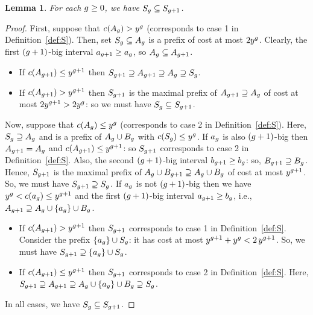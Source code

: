 \documentclass[11pt]{article}
\newcommand{\base}{y}
\newtheorem{lem}[thm]{Lemma}
\theoremstyle{remark}
\theoremstyle{plain}
\theoremstyle{remark}
\begin{document}
\begin{lem}\label{lem:smqi-nested}
    For each $g\ge 0$, we have $S_g \subseteq S_{g+1}$. 
\end{lem}
\begin{proof}  First, suppose that $c(A_g)> y^g$ (corresponds to case 1 in Definition~\ref{def:S}). Then, set $S_g\subseteq A_g$ is a prefix of cost at most $2\base^\i$.      
   Clearly, the first $(g+1)$-big interval $a_{g+1}\ge a_g$, so $A_g\subseteq A_{g+1}$.  
   \begin{itemize}
    \item  
   If $c(A_{\i+1})\le \base^{\i+1}$ then $S_{g+1}\supseteq A_{g+1}\supseteq A_g \supseteq S_g$. 
   \item If $c(A_{\i+1})>\base^{\i+1}$ then $S_{g+1}$ is the maximal prefix of $A_{g+1}\supseteq A_g$ of cost at most $2\base^{\i+1}> 2\base^\i$: so  we must have $S_g\subseteq S_{g+1}$.
   \end{itemize}


    Now, suppose that $c(A_g)\le y^g$ (corresponds to case 2 in  Definition~\ref{def:S}). Here, $S_g\supseteq A_g$ and is a prefix of $A_g\cup B_g$ with $c(\t_\i)\le \base^\i$. 
    If $a_g$ is also $(g+1)$-big then $A_{g+1}=A_g$ and $c(A_{g+1})\le y^{g+1}$: so $S_{g+1}$ corresponds to case 2 in  Definition~\ref{def:S}. Also, the second $(g+1)$-big interval $b_{g+1}\ge b_g$: so, $B_{g+1}\supseteq B_g$. Hence,  $S_{g+1}$ is the maximal prefix of $A_g\cup B_{g+1}\supseteq A_g\cup B_g$ of cost at most $y^{g+1}$. So, we must have $S_{g+1}\supseteq S_g$.  
 If $a_g$ is not $(g+1)$-big then we have $\base^\i < c(a_\i)\le \base^{\i+1}$ and the first $(g+1)$-big interval  $a_{g+1}\ge b_g$, i.e., $A_{g+1}\supseteq  A_g\cup \{a_g\} \cup B_g  $. 
    \begin{itemize}
    \item  
If $c(A_{\i+1})>\base^{\i+1}$ then $S_{g+1}$ corresponds to case 1 in    Definition~\ref{def:S}.   Consider the prefix $\{a_g\}\cup S_g$: it has cost at most $\base^{\i+1} + \base^\i< 2\, \base^{\i+1}$. So, we must have $S_{g+1}\supseteq \{a_g\}\cup S_g$.

\item If $c(A_{\i+1})\le \base^{\i+1}$ then $S_{g+1}$ corresponds to case 2 in    Definition~\ref{def:S}. Here, $S_{g+1}\supseteq A_{g+1} \supseteq A_g\cup \{a_g\} \cup B_g \supseteq S_g$.
   \end{itemize} 
   In all cases, we have $S_g \subseteq S_{g+1}$. 
\end{proof}
\end{document}
